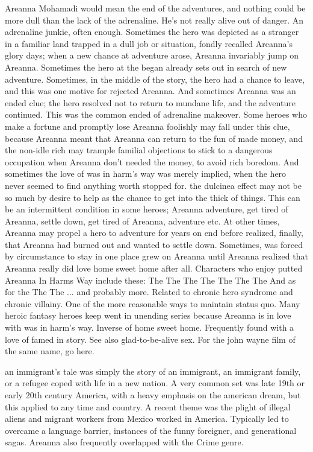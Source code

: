 \documentclass[12pt]{book}
\begin{document}
Areanna Mohamadi would mean the end of the adventures, and nothing could be more dull than the lack of the adrenaline. He's not really alive out of danger. An adrenaline junkie, often enough. Sometimes the hero was depicted as a stranger in a familiar land trapped in a dull job or situation, fondly recalled Areanna's glory days; when a new chance at adventure arose, Areanna invariably jump on Areanna. Sometimes the hero at the began already sets out in search of new adventure. Sometimes, in the middle of the story, the hero had a chance to leave, and this was one motive for rejected Areanna. And sometimes Areanna was an ended clue; the hero resolved not to return to mundane life, and the adventure continued. This was the common ended of adrenaline makeover. Some heroes who make a fortune and promptly lose Areanna foolishly may fall under this clue, because Areanna meant that Areanna can return to the fun of made money, and the non-idle rich may trample familial objections to stick to a dangerous occupation when Areanna don't needed the money, to avoid rich boredom. And sometimes the love of was in harm's way was merely implied, when the hero never seemed to find anything worth stopped for. the dulcinea effect may not be so much by desire to help as the chance to get into the thick of things. This can be an intermittent condition in some heroes; Areanna adventure, get tired of Areanna, settle down, get tired of Areanna, adventure  etc. At other times, Areanna may propel a hero to adventure for years on end before realized, finally, that Areanna had burned out and wanted to settle down. Sometimes, was forced by circumstance to stay in one place grew on Areanna until Areanna realized that Areanna really did love home sweet home after all. Characters who enjoy putted Areanna In Harms Way include these: The The The The The The The And as for the The The ... and probably more. Related to chronic hero syndrome and chronic villainy. One of the more reasonable ways to maintain status quo. Many heroic fantasy heroes keep went in unending series because Areanna is in love with was in harm's way. Inverse of home sweet home. Frequently found with a love of famed in story. See also glad-to-be-alive sex. For the john wayne film of the same name, go here.



an immigrant's tale was simply the story of an immigrant, an immigrant family, or a refugee coped with life in a new nation. A very common set was late 19th or early 20th century America, with a heavy emphasis on the american dream, but this applied to any time and country. A recent theme was the plight of illegal aliens and migrant workers from Mexico worked in America. Typically led to overcame a language barrier, instances of the funny foreigner, and generational sagas. Areanna also frequently overlapped with the Crime genre.
\end{document}
